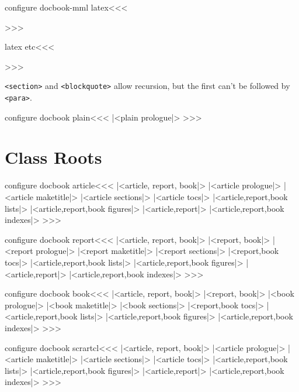 \<configure docbook-mml latex\><<<
   {\IgnorePar\EndP{}}
   {}
   {\IgnorePar{}\ShowPar\par}
>>>







\<latex etc\><<<
   {\IgnorePar\EndP{}}
   {\ShowPar\par}
   {\IgnorePar\EndP{}\ShowPar\par}
>>>

\verb+<section>+ and \verb+<blockquote>+ allow recursion,
but the first can't be followed by \verb+<para>+.


\<configure docbook plain\><<< 
|<plain prologue|>
>>>

\section{Class Roots}

\<configure docbook article\><<< 
|<article, report, book|>
|<article prologue|>
|<article maketitle|>
|<article sections|>
|<article tocs|>
|<article,report,book lists|>
|<article,report,book figures|>
|<article,report|>
|<article,report,book indexes|>
>>>



\<configure docbook report\><<< 
|<article, report, book|>
|<report, book|>
|<report prologue|>
|<report maketitle|>
|<report sections|>
|<report,book tocs|>
|<article,report,book lists|>
|<article,report,book figures|>
|<article,report|>
|<article,report,book indexes|>
>>>



\<configure docbook book\><<< 
|<article, report, book|>
|<report, book|>
|<book prologue|>
|<book maketitle|>
|<book sections|>
|<report,book tocs|>
|<article,report,book lists|>
|<article,report,book figures|>
|<article,report,book indexes|>
>>>



\<configure docbook scrartcl\><<< 
|<article, report, book|>
|<article prologue|>
|<article maketitle|>
|<article sections|>
|<article tocs|>
|<article,report,book lists|>
|<article,report,book figures|>
|<article,report|>
|<article,report,book indexes|>
>>>

